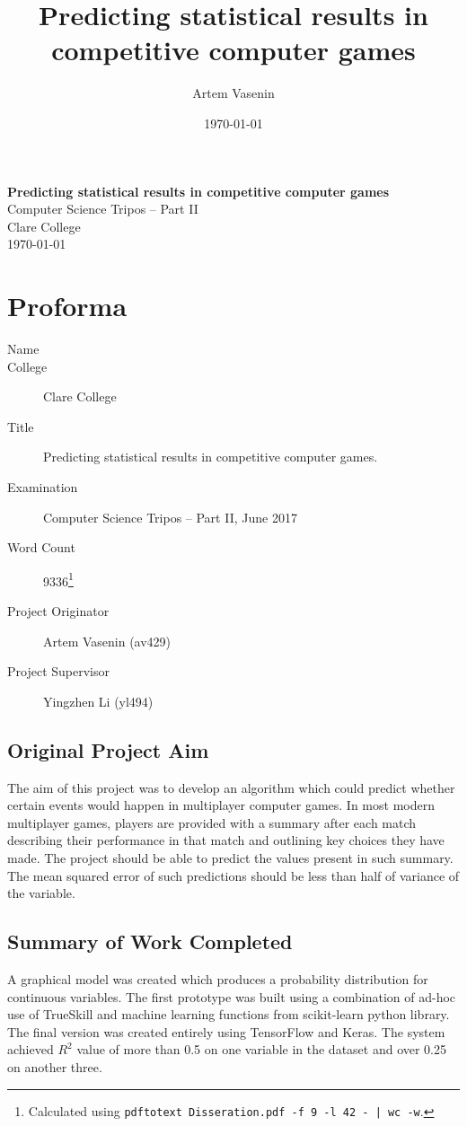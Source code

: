 \documentclass[12pt,a4paper]{book}
\title{Predicting statistical results in competitive computer games}
\author{Artem Vasenin}
\date{\today}
\newcommand\college{Clare College}
\begin{document}
\frontmatter


\pagestyle{empty}

\rightline{\LARGE \textbf{\theauthor}}

\vspace*{60mm}
\begin{center}
\Huge
\textbf{Predicting statistical results in competitive computer games} \\[5mm]
Computer Science Tripos -- Part II \\[5mm]
\college \\[5mm]
\today  %
\end{center}



\cleardoublepage
\pagestyle{plain}

\section*{Proforma}
\begin{description}
\item[Name] \theauthor
\item[College] \college
\item[Title] Predicting statistical results in competitive computer games.
\item[Examination] Computer Science Tripos -- Part II, June 2017
\item[Word Count] 9336\footnote{Calculated using \texttt{pdftotext Disseration.pdf -f 9 -l 42  - | wc -w}.} %
\item[Project Originator] Artem Vasenin (av429)
\item[Project Supervisor] Yingzhen Li (yl494)
\end{description}

\subsection*{Original Project Aim}
The aim of this project was to develop an algorithm which could predict whether certain events would happen in multiplayer computer games.
In most modern multiplayer games, players are provided with a summary after each match describing their performance in that match and outlining key choices they have made.
The project should be able to predict the values present in such summary.
The mean squared error of such predictions should be less than half of variance of the variable.
\subsection*{Summary of Work Completed}
A graphical model was created which produces a probability distribution for continuous variables.
The first prototype was built using a combination of ad-hoc use of TrueSkill and machine learning functions from scikit-learn python library.
The final version was created entirely using TensorFlow and Keras.
The system achieved $R^2$ value of more than 0.5 on one variable in the dataset and over 0.25 on another three.
\end{document}
